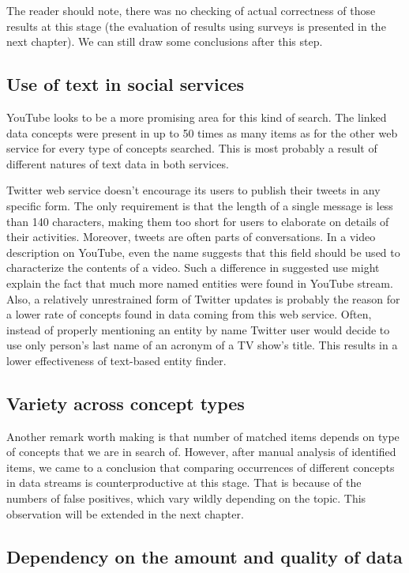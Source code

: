 The reader should note, there was no checking of actual correctness of those results at
this stage (the evaluation of results using surveys is presented in the next chapter). We
can still draw some conclusions after this step.

\subsection{Use of text in social services}
YouTube looks to be a more promising area for this kind of search. The
linked data concepts were present in up to 50 times as many items as for the other
web service for every type of concepts searched. This is most probably a
result of different natures of text data in both services.  

Twitter web service doesn't encourage its users to publish their tweets in any
specific form. The only requirement is that the length of a single message
is less than 140 characters, making them too short for users to elaborate
on details of their activities. Moreover, tweets are often parts of
conversations. In a video description on YouTube, even the name
suggests that this field should be used to characterize the contents
of a video. Such a difference in suggested use might explain the fact that
much more named entities were found in YouTube stream. Also, a relatively
unrestrained form of Twitter updates is probably the reason for a lower rate of
concepts found in data coming from this web service. Often, instead of properly
mentioning an entity by name Twitter user would decide to use only person's
last name of an acronym of a TV show's title. This results in a
lower effectiveness of text-based entity finder.

\subsection{Variety across concept types}
Another remark worth making is that number of matched items depends on type of
concepts that we are in search of. However, after manual analysis of identified
items, we came to a conclusion that comparing occurrences of
different concepts in data streams is counterproductive at this stage.
That is because of the numbers of false positives, which vary wildly
depending on the topic. This observation will be extended in the next chapter.

\subsection{Dependency on the amount and quality of data}

